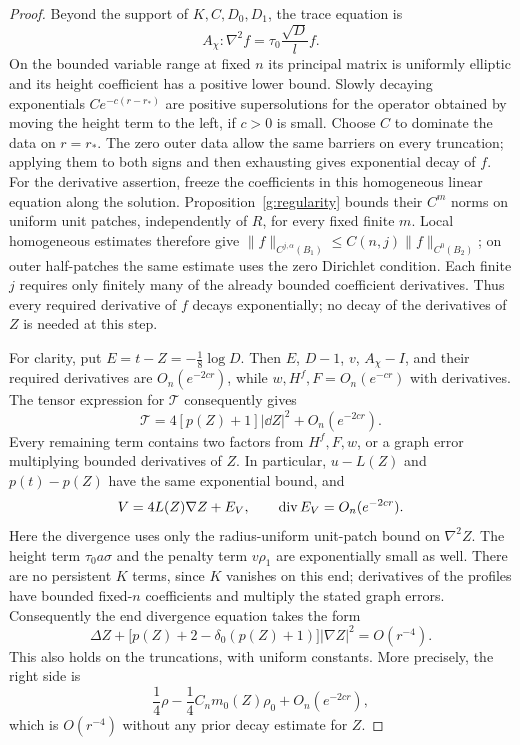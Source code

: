 \begin{proof}
Beyond the support of $K,C,D_0,D_1$, the trace equation is
\[
 A_\chi:\nabla^2 f=\tau_0\frac{\sqrt D}{l}f.
\]
On the bounded variable range at fixed $n$ its principal matrix is
uniformly elliptic and its height coefficient has a positive lower
bound.  Slowly decaying exponentials $Ce^{-c(r-r_*)}$ are positive
supersolutions for the operator obtained by moving the height term to
the left, if $c>0$ is small.  Choose $C$ to dominate the data on
$r=r_*$.  The zero outer data allow the same barriers on every
truncation; applying them to both signs and then exhausting gives
exponential decay of $f$.  For the derivative assertion, freeze the
coefficients in this homogeneous linear equation along the solution.
Proposition~\ref{g:regularity} bounds their $C^m$ norms on uniform
unit patches, independently of $R$, for every fixed finite $m$.
Local homogeneous estimates therefore give
$\|f\|_{C^{j,\alpha}(B_1)}\le C(n,j)\|f\|_{C^0(B_2)}$;
on outer half-patches the same estimate uses the zero Dirichlet
condition.  Each finite $j$ requires only finitely many of the already
bounded coefficient derivatives.  Thus every required derivative of
$f$ decays exponentially; no decay of the derivatives of $Z$ is
needed at this step.

For clarity, put $E=t-Z=-\tfrac18\log D$.  Then $E$, $D-1$,
$v$, $A_\chi-I$, and their required derivatives are
$O_n(e^{-2cr})$, while $w,H^f,F=O_n(e^{-cr})$ with derivatives.
The tensor expression for $\mathcal T$ consequently gives
\[
 \mathcal T=4[p(Z)+1]|\dd Z|^2+O_n(e^{-2cr}).
\]
Every remaining term contains two factors from $H^f,F,w$, or a graph
error multiplying bounded derivatives of $Z$.  In particular,
$u-L(Z)$ and $p(t)-p(Z)$ have the same exponential bound, and
\[
 V=4L(Z)\nabla Z+E_V,\qquad
 \operatorname{div} E_V=O_n(e^{-2cr}).
\]
Here the divergence uses only the radius-uniform unit-patch bound on
$\nabla^2Z$.  The height term $\tau_0a\sigma$ and the penalty term
$v\rho_1$ are exponentially small as well.  There are no persistent
$K$ terms, since $K$ vanishes on this end; derivatives of the profiles
have bounded fixed-$n$ coefficients and multiply the stated graph
errors.  Consequently the end divergence equation takes the form
\begin{equation}\label{e:end-Z-equation}
 \Delta Z+
 \bigl[p(Z)+2-\delta_0(p(Z)+1)\bigr]|\nabla Z|^2
                                     =O(r^{-4}).
\end{equation}
This also holds on the truncations, with uniform constants.  More
precisely, the right side is
\[
 \frac14\rho-\frac14C_nm_0(Z)\rho_0+O_n(e^{-2cr}),
\]
which is $O(r^{-4})$ without any prior decay estimate for $Z$.


\end{proof}

